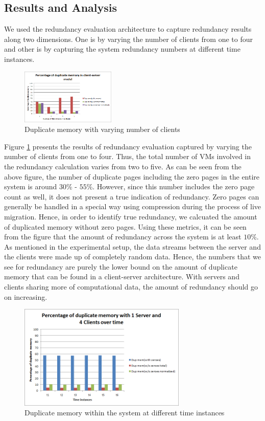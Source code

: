 \documentclass{acm_proc_article-sp}
\begin{document}
\subsection{Results and Analysis}
We used the redundancy evaluation architecture to capture redundancy results along two dimensions. One is by varying the number of clients from one to four and other is by capturing the system redundancy numbers at different time instances.

\begin{figure}[htbp]
\centering
        \includegraphics[width=0.4\textwidth]{client-server1.png}
    \caption{Duplicate memory with varying number of clients}
    \label{fig:client-server1}
\end{figure}

Figure \ref{fig:client-server1} presents the results of redundancy evaluation captured by varying the number of clients from one to four. Thus, the total number of VMs involved in the redundancy calculation varies from two to five. As can be seen from the above figure, the number of duplicate pages including the zero pages in the entire system is around $30$\% - $55$\%.	However, since this number includes the zero page count as well, it does not present a true indication of redundancy. Zero pages can generally be handled in a special way using compression during the process of live migration. Hence, in order to identify true redundancy, we calcuated the amount of duplicated memory without zero pages. Using these metrics, it can be seen from the figure that the amount of redundancy across the system is at least $10$\%. As mentioned in the experimental setup, the data streams between the server and the clients were made up of completely random data. Hence, the numbers that we see for redundancy are purely the lower bound on the amount of duplicate memory that can be found in a client-server architecture. With servers and clients sharing more of computational data, the amount of redundancy should go on increasing.

\begin{figure}[htbp]
\centering
        \includegraphics[width=8cm]{client-server2.png}
    \caption{Duplicate memory within the system at different time instances}
    \label{fig:client-server2}
\end{figure}
\end{document}
